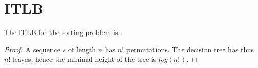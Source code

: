 \section{ITLB}
\label{tree:sorting:ITLB}

\begin{theorem}
The ITLB for the sorting problem is .
\end{theorem}

\begin{proof}
A sequence $s$ of length $n$ has $n!$ permutations. The decision tree has thus $n!$ leaves, hence the minimal height of the tree is $log(n!)$.
\end{proof}


